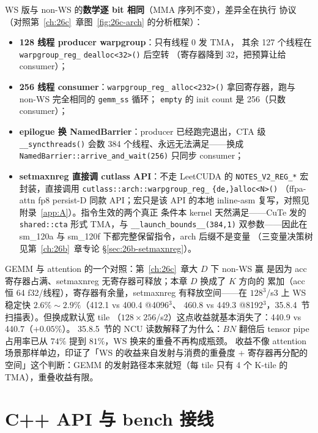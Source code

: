 WS 版与 non-WS 的\textbf{数学逐 bit 相同}（MMA 序列不变），差异全在执行
协议（对照第~\ref{ch:26c}~章图~\ref{fig:26c-arch} 的分析框架）：

\begin{itemize}[itemsep=1pt,topsep=2pt]
  \item \textbf{128 线程 producer warpgroup}：只有线程 0 发 TMA，
        其余 127 个线程在 \texttt{warpgroup\_reg\_}\allowbreak
        \texttt{dealloc<32>()} 后空转
        （寄存器降到 32，把预算让给 consumer）；
  \item \textbf{256 线程 consumer}：\texttt{warpgroup\_reg\_}\allowbreak
        \texttt{alloc<232>()} 拿回寄存器，跑与 non-WS 完全相同的
        \texttt{gemm\_ss} 循环；
        \texttt{empty} 的 init count 是 256（只数 consumer）；
  \item \textbf{epilogue 换 NamedBarrier}：producer 已经跑完退出，CTA 级
        \texttt{\_\_syncthreads()} 会数 384 个线程、永远无法满足——换成
        \texttt{NamedBarrier::arrive\_and\_wait(256)} 只同步 consumer；
  \item \textbf{setmaxnreg 直接调 cutlass API}：不走 LeetCUDA 的
        \texttt{NOTES\_V2\_REG\_*} 宏封装，直接调用
        \texttt{cutlass::arch::}\allowbreak\texttt{warpgroup\_reg\_}\allowbreak
        \texttt{\{de,\}alloc<N>()}
        （ffpa-attn fp8 persist-D 同款 API；宏只是该 API 的本地
        inline-asm 复写，对照见附录~\ref{app:A}）。指令生效的两个真正
        条件本 kernel 天然满足——CuTe 发的 \texttt{shared::cta} 形式
        TMA，与 \texttt{\_\_launch\_bounds\_\_(384,1)} 双参数——因此在
        sm\_120a 与 sm\_120f 下都完整保留指令，arch 后缀不是变量
        （三变量决策树见第~\ref{ch:26b}~章专论
        \S\ref{sec:26b-setmaxnreg}）。
\end{itemize}

GEMM 与 attention 的一个对照：第~\ref{ch:26c}~章大 $D$ 下 non-WS 赢
是因为 acc 寄存器占满、setmaxnreg 无寄存器可释放；本章 $D$ 换成了 $K$ 方向的
累加（acc 恒 64 f32/线程），寄存器有余量，setmaxnreg 有释放空间——在
$128^3$/s3 上 WS 稳定快 $2.6\%\sim2.9\%$（412.1 vs 400.4 @4096$^3$、
460.8 vs 449.3 @8192$^3$，35.8.4~节扫描表）。但换成默认宽 tile
（$128\times256$/s2）这点收益就基本消失了：440.9 vs 440.7（$+0.05\%$）。
35.8.5~节的 NCU 读数解释了为什么：$BN$ 翻倍后 tensor pipe 占用率已从
$74\%$ 提到 $81\%$，WS 换来的重叠不再构成瓶颈。
收益不像 attention 场景那样单边，印证了「WS 的收益来自发射与消费的重叠度 +
寄存器再分配的空间」这个判断：GEMM 的发射路径本来就短（每 tile 只有
4 个 K-tile 的 TMA），重叠收益有限。

\section{C++ API 与 bench 接线}\label{sec:35-api}

